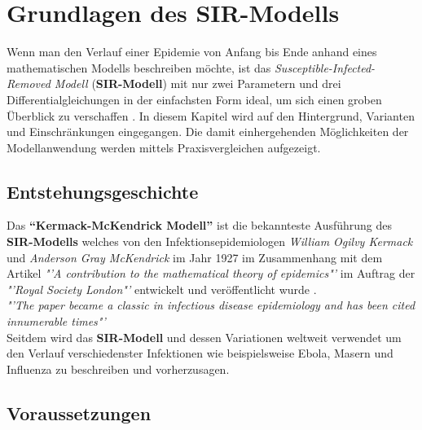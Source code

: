 \documentclass[12pt]{scrartcl} %
\begin{document}

\newpage
\section{Grundlagen des SIR-Modells}

Wenn man den Verlauf einer Epidemie von Anfang bis Ende anhand eines mathematischen Modells beschreiben möchte, ist das \textsl{Susceptible-Infected-Removed Modell} (\textbf{SIR-Modell}) mit nur zwei Parametern und drei Differentialgleichungen in der einfachsten Form ideal, um sich einen groben Überblick zu verschaffen \cite{4}.
In diesem Kapitel wird auf den Hintergrund, Varianten und Einschränkungen eingegangen. Die damit einhergehenden Möglichkeiten der Modellanwendung werden mittels Praxisvergleichen aufgezeigt.


\subsection{Entstehungsgeschichte}

Das \textbf{"`Kermack-McKendrick Modell"'} ist die bekannteste Ausführung des \textbf{SIR-Modells} welches von den Infektionsepidemiologen \textsl{William Ogilvy Kermack} und \textsl{Anderson Gray McKendrick} im Jahr 1927 im Zusammenhang mit dem Artikel 
\textsl{"'A contribution to the mathematical theory of epidemics"'} \cite{7} im Auftrag der \textsl{"'Royal Society London"'} entwickelt und veröffentlicht wurde \cite{6}.\\

\textsl{"'The paper became a classic in infectious disease epidemiology and has been cited innumerable times"'} \cite[s. 1]{6} \\

Seitdem wird das \textbf{SIR-Modell} und dessen Variationen weltweit verwendet um den Verlauf verschiedenster Infektionen
wie beispielsweise Ebola, Masern und Influenza zu beschreiben und vorherzusagen. \cite{3}



\subsection{Voraussetzungen}
\end{document}
